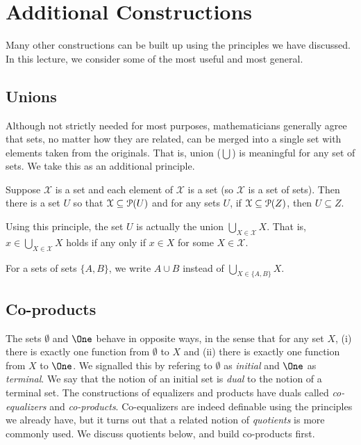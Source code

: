 \chapter{Additional Constructions}


\begin{goals}
	
\end{goals}
Many other constructions can be built up using the principles we have discussed. 
In this lecture, we consider some of the most useful and most general.

\section{Unions}

Although not strictly needed for most purposes, mathematicians generally agree that sets, no matter how they are related, can be merged into a single set with elements taken from the originals. 
That is, union ($\bigcup$) is meaningful for any set of sets. We take this as an additional principle.

\begin{principle}
	Suppose $\mathcal X$ is a set and each element of $\mathcal X$ is a set (so $\mathcal X$ is a set of sets).
	Then there is a set $U$ so that $\mathcal X\subseteq {\mathcal{P}}(U)$ and 
	for any sets $U$, if $\mathcal X\subseteq{\mathcal{P}}(Z)$, then $U\subseteq Z$.
\end{principle}

Using this principle, the set $U$ is actually the union $\bigcup_{X\in\mathcal X}X$.
That is, $x\in\bigcup_{X\in\mathcal X}X$ holds if any only if $x\in X$ for some $X\in\mathcal X$.

For a sets of sets $\{A,B\}$, we write $A\cup B$ instead of $\bigcup_{X\in\{A,B\}}X$.

\section{Co-products}

The sets $\emptyset$ and $\One$ behave in opposite ways, in the sense that for any set $X$, (i) there is exactly one function from $\emptyset$ to $X$ and (ii) there is exactly one function from $X$ to $\One$. 
We signalled this by refering to $\emptyset$ as \emph{initial} and $\One$ as \emph{terminal}. 
We say that the notion of an initial set is \emph{dual} to the notion of a terminal set. 
The constructions of equalizers and products have duals called \emph{co-equalizers} and \emph{co-products}. 
Co-equalizers are indeed definable using the principles we already have, but it turns out that a related notion of \emph{quotients} is more commonly used. We discuss quotients below, and build co-products first.

